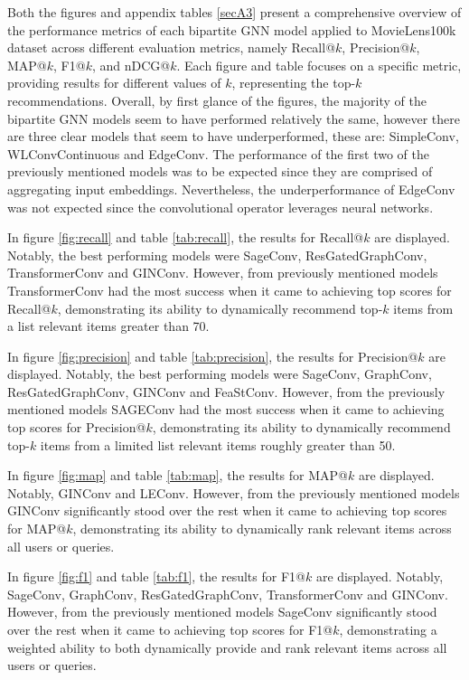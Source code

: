 \documentclass[bst/sn-nature]{sn-jnl}
\begin{document}
\begin{multicols}{2}
\quad Both the figures and appendix tables \ref{secA3} present a comprehensive overview of the performance metrics of each bipartite GNN model applied to MovieLens100k dataset across different evaluation metrics, namely Recall@$k$, Precision@$k$, MAP@$k$, F1@$k$, and nDCG@$k$. Each figure and table focuses on a specific metric, providing results for different values of $k$, representing the top-$k$ recommendations. Overall, by first glance of the figures, the majority of the bipartite GNN models seem to have performed relatively the same, however there are three clear models that seem to have underperformed, these are: SimpleConv, WLConvContinuous and EdgeConv. The performance of the first two of the previously mentioned models was to be expected since they are comprised of aggregating input embeddings. Nevertheless, the underperformance of EdgeConv was not expected since the convolutional operator leverages neural networks.

In figure \ref{fig:recall} and table \ref{tab:recall}, the results for Recall@$k$ are displayed. Notably, the best performing models were SageConv, ResGatedGraphConv, TransformerConv and GINConv. However, from previously mentioned models TransformerConv had the most success when it came to achieving top scores for Recall@$k$, demonstrating its ability to dynamically recommend top-$k$ items from a list relevant items greater than 70.

In figure \ref{fig:precision} and table \ref{tab:precision}, the results for Precision@$k$ are displayed. Notably, the best performing models were SageConv, GraphConv, ResGatedGraphConv, GINConv and FeaStConv. However, from the previously mentioned models SAGEConv had the most success when it came to achieving top scores for Precision@$k$, demonstrating its ability to dynamically recommend top-$k$ items from a limited list relevant items roughly greater than 50.

In figure \ref{fig:map} and table \ref{tab:map}, the results for MAP@$k$ are displayed. Notably, GINConv and LEConv. However, from the previously mentioned models GINConv significantly stood over the rest when it came to achieving top scores for MAP@$k$, demonstrating its ability to dynamically rank relevant items across all users or queries.

In figure \ref{fig:f1} and table \ref{tab:f1}, the results for F1@$k$ are displayed. Notably, SageConv, GraphConv, ResGatedGraphConv, TransformerConv and GINConv. However, from the previously mentioned models SageConv significantly stood over the rest when it came to achieving top scores for F1@$k$, demonstrating a weighted ability to both dynamically provide and rank relevant items across all users or queries.


\end{multicols}
\end{document}

